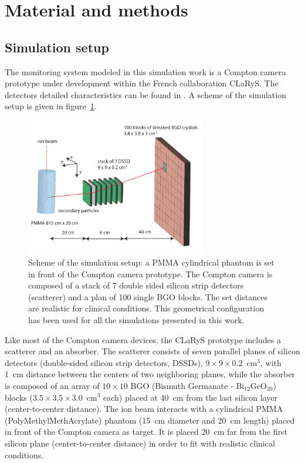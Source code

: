
\section{Material and methods}

\subsection{Simulation setup}

The monitoring system modeled in this simulation work is a Compton camera prototype under development within the French collaboration CLaRyS. The detectors detailed characteristics can be found in \cite{krimmer:hal-01101334}. A scheme of the simulation setup is given in figure~\ref{fig:fig_setup_CC_simulation_Hadronth}.

\begin{figure} [!hbtp]	
  \centering
  \includegraphics[width=0.7\textwidth]{./Figure/Compton_Camera_hadontherapy_PMMA_Cylinder_EN.pdf}
  \caption{Scheme of the simulation setup: a PMMA cylindrical phantom is set in front of the Compton camera prototype. The Compton camera is composed of a stack of 7 double sided silicon strip detectors (scatterer) and a plan of 100 single BGO blocks. The set distances are realistic for clinical conditions. This geometrical configuration has been used for all the simulations presented in this work.}
  \label{fig:fig_setup_CC_simulation_Hadronth}
\end{figure}

Like most of the Compton camera devices, the CLaRyS prototype includes a scatterer and an absorber. The scatterer consists of seven parallel planes of silicon detectors (double-sided silicon strip detectors, DSSDs), $9\times9\times0.2$~cm$^3$, with 1~cm distance between the centers of two neighboring planes, while the absorber is composed of an array of $10\times10$ BGO (Bismuth Germanate - Bi$_12$GeO$_20$) blocks ($3.5\times3.5\times3.0$~cm$^3$ each) placed at 40~cm from the last silicon layer (center-to-center distance). The ion beam interacts with a cylindrical PMMA (PolyMethylMethAcrylate) phantom (15~cm diameter and 20~cm length) placed in front of the Compton camera as target. It is placed 20~cm far from the first silicon plane (center-to-center distance) in order to fit with realistic clinical conditions.

